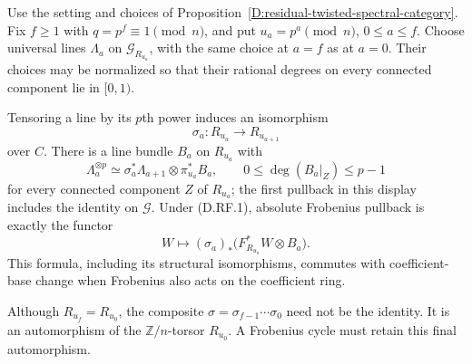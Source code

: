 \begin{proposition}
\label{D:residual-twisted-Frobenius-transport}
Use the setting and choices of
Proposition~\ref{D:residual-twisted-spectral-category}.
Fix $f\ge1$ with $q=p^f\equiv1\pmod n$, and put
$u_a=p^a\pmod n$, $0\le a\le f$.
Choose universal lines $\Lambda_a$ on $\mathcal G_{R_{u_a}}$,
with the same choice at $a=f$ as at $a=0$.
Their choices may be normalized so that their rational degrees on
every connected component lie in $[0,1)$.

Tensoring a line by its $p$th power induces an isomorphism
\[
                  \sigma_a:R_{u_a}\longrightarrow R_{u_{a+1}}
                                                               \tag{D.RF.4}
\]
over $C$. There is a line bundle $B_a$ on $R_{u_a}$ with
\[
 \Lambda_a^{\otimes p}
     \simeq \sigma_a^*\Lambda_{a+1}\otimes\pi_{u_a}^*B_a,
       \qquad 0\le\deg(B_a|_Z)\le p-1                    \tag{D.RF.5}
\]
for every connected component $Z$ of $R_{u_a}$; the first pullback
in this display includes the identity on $\mathcal G$.
Under (D.RF.1), absolute Frobenius pullback is exactly the functor
\[
             W\longmapsto
       (\sigma_a)_*\bigl(F_{R_{u_a}}^*W\otimes B_a\bigr).
                                                               \tag{D.RF.6}
\]
This formula, including its structural isomorphisms, commutes with
coefficient-base change when Frobenius also acts on the coefficient
ring.

Although $R_{u_f}=R_{u_0}$, the composite
$\sigma=\sigma_{f-1}\cdots\sigma_0$ need not be the identity.
It is an automorphism of the $\mathbb Z/n$-torsor $R_{u_0}$.
A Frobenius cycle must retain this final automorphism.
\end{proposition}

